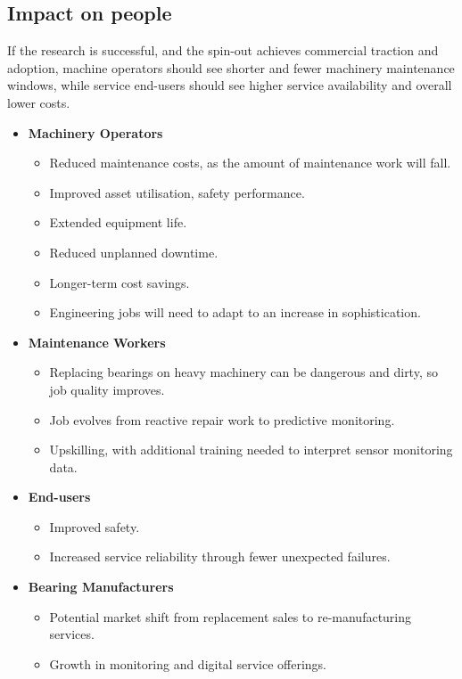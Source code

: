 \documentclass[runningheads]{llncs}
\begin{document}
\subsection{Impact on people}
    If the research is successful, and the spin-out achieves commercial traction and adoption, machine operators should see shorter and fewer machinery maintenance windows, while service end-users should see higher service availability and overall lower costs.
    \begin{itemize}
    \item \textbf{Machinery Operators}
    \begin{itemize}
        \item Reduced maintenance costs, as the amount of maintenance work will fall.
        \item Improved asset utilisation, safety performance.
        \item Extended equipment life.
        \item Reduced unplanned downtime.
        \item Longer-term cost savings.
        \item Engineering jobs will need to adapt to an increase in sophistication.
    \end{itemize}
    \item \textbf{Maintenance Workers}
    \begin{itemize}
        \item Replacing bearings on heavy machinery can be dangerous and dirty, so job quality improves.
        \item Job evolves from reactive repair work to predictive monitoring.
        \item Upskilling, with additional training needed to interpret sensor monitoring data.
    \end{itemize}
    \item \textbf{End-users}
    \begin{itemize}
        \item Improved safety.
        \item Increased service reliability through fewer unexpected failures.
    \end{itemize}
    \item \textbf{Bearing Manufacturers}
    \begin{itemize}
        \item Potential market shift from replacement sales to re-manufacturing services.
        \item Growth in monitoring and digital service offerings.

\end{itemize}
\end{itemize}
\end{document}
